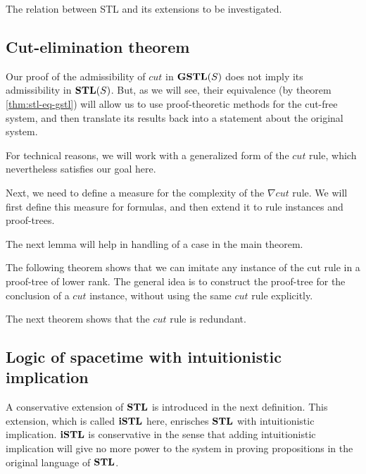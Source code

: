 \documentclass[12pt,a4paper]{article}
\begin{document}

{\color{red} The relation between STL and its extensions to be investigated.}

\subsection{Cut-elimination theorem}
Our proof of the admissibility of $cut$ in $\mathbf{GSTL}(S)$ does not imply its admissibility in $\mathbf{STL}(S)$. But, as we will see, their equivalence (by theorem \ref{thm:stl-eq-gstl}) will allow us to use proof-theoretic methods for the cut-free system, and then translate its results back into a statement about the original system.

For technical reasons, we will work with a generalized form of the $cut$ rule, which nevertheless satisfies our goal here.





Next, we need to define a measure for the complexity of the $\nabla cut$ rule. We will first define this measure for formulas, and then extend it to rule instances and proof-trees.



The next lemma will help in handling of a case in the main theorem.



The following theorem shows that we can imitate any instance of the cut rule in a proof-tree of lower rank. The general idea is to construct the proof-tree for the conclusion of a $cut$ instance, without using the same $cut$ rule explicitly.



The next theorem shows that the $cut$ rule is redundant.



\subsection{Logic of spacetime with intuitionistic implication}
A conservative extension of $\mathbf{STL}$ is introduced in the next definition. This extension, which is called $\mathbf{iSTL}$ here, enrisches $\mathbf{STL}$ with intuitionistic implication. $\mathbf{iSTL}$ is conservative in the sense that adding intuitionistic implication will give no more power to the system in proving propositions in the original language of $\mathbf{STL}$.


\end{document}
